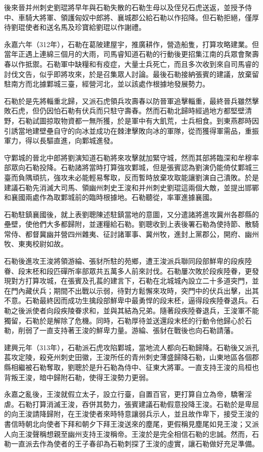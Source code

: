 後來晉并州刺史劉琨將早年與石勒失散的石勒生母以及侄兒石虎送返，並授予侍中、車騎大將軍、領護匈奴中郎將、襄城郡公給石勒以作招降。但石勒拒絕，僅厚待劉琨使者和送名馬及珍寶給劉琨以作謝禮。

永嘉六年（312年），石勒在葛陂建屋宇，推廣耕作，營造船隻，打算攻略建業。但當年正遇上連綿三個月的大雨，司馬睿知道石勒的行動後更招集江南的兵眾會聚壽春以作抵禦。石勒軍中缺糧和有疫症，大量士兵死亡，而且多次收到來自司馬睿的討伐文告，似乎即將攻來，於是召集眾人討論。最後石勒接納張賓的建議，放棄留駐南方而北據鄴城三臺，經營河北，並以該處作根據地發展勢力。

石勒於是先將輜重北歸，又派石虎領兵攻壽春以防晉軍追擊輜重，最終晉兵雖然擊敗石虎，但仍因怕石勒有伏兵而只駐守壽春。然而石勒北歸時經過地方都堅壁清野，石勒試圖掠取物資都一無所獲，於是軍中有大飢荒，士兵相食。到東燕郡時因引誘當地建壁壘自守的向冰並成功在棘津擊敗向冰的軍隊，從而獲得軍需品，重振軍力，得以長驅直進，向鄴城進發。

守鄴城的晉北中郎將劉演知道石勒將來攻擊就加緊守城，然而其部將臨深和牟穆率部眾向石勒投降。石勒諸將當時打算強攻鄴城，但是張賓認為劉演仍能倚仗鄴城三臺而負隅頑抗，強攻未必能輕易奪取，反而暫時放棄攻取能讓劉演自己潰敗。於是建議石勒先消滅大司馬、領幽州刺史王浚和并州刺史劉琨這兩個大敵，並提出邯鄲和襄國兩處作為取鄴城前的臨時根據地。石勒聽從，率軍進據襄國。

石勒駐鎮襄國後，就上表劉聰陳述駐鎮當地的意圖，又分遣諸將進攻冀州各郡縣的壘壁，使他們大多都歸附，並運糧給石勒。劉聰收到上表後署石勒為使持節、散騎常侍、都督冀幽并營四州雜夷、征討諸軍事、冀州牧，進封上黨郡公，開府、幽州牧、東夷校尉如故。

石勒後進攻王浚將領游綸、張豺所駐的苑鄉，遭王浚派兵聯同段部鮮卑的段疾陸眷、段末柸和段匹磾所率部眾共五萬多人前來討伐。石勒屢次敗於段疾陸眷，更發現對方打算攻城，在張賓及孔萇的建言下，石勒在北城城內設立二十多道突門，並在門內藏伏兵；期間不出戰以示弱，待對方鬆懈來攻時，突門中的伏兵出擊，出其不意。石勒最終因而成功生擒段部鮮卑中最勇悍的段末柸，逼得段疾陸眷退兵。石勒之後派使者向段疾陵眷求和，並與其結為兄弟。隨著段疾陸眷退兵，王浚軍不能獨留，石勒於是解除了危機。同時，石勒厚待並送還段末柸的行動令他歸心於石勒，削弱了一直支持著王浚的鮮卑力量。游綸、張豺在戰後也向石勒請藩。

建興元年（313年），石勒派石虎攻陷鄴城，當地流人都向石勒歸降。石勒後又派孔萇攻定陵，殺兗州刺史田徽，王浚所任的青州刺史薄盛歸降石勒，山東地區各個郡縣相繼被石勒奪取，劉聰於是升石勒為侍中、征東大將軍。一直支持王浚的烏桓也背叛王浚，暗中歸附石勒，使得王浚勢力更弱。

永嘉之亂後，王浚就假立太子，設立行臺，自置百官，更打算自立為帝，驕奢淫虐。石勒打算消滅王浚，吞併其勢力，張賓建議石勒假意投降王浚。石勒於是卑屈的向王浚請降歸附，在王浚使者來時特意讓弱兵示人，並且故作卑下，接受王浚的書信時朝北向使者下拜和朝夕下拜王浚送來的塵尾，更假稱見塵尾如見王浚；又派人向王浚聲稱想親至幽州支持王浚稱帝。王浚於是完全相信石勒的忠誠。然而，石勒一直派去作為使者的王子春卻為石勒刺探了王浚的虛實，讓石勒做好充足準備。


